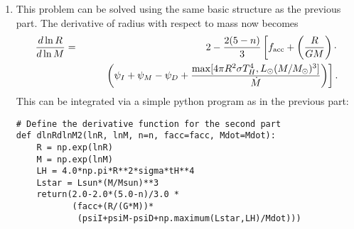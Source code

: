 \begin{enumerate}
\begin{enumerate}
\begin{verbatim}
# Define some constants in cgs
G = 6.67e-8
eV = 1.6e-12
amu = 1.66e-24
sigma = 5.67e-5
Msun = 1.99e33
Rsun = 6.96e10
Lsun = 3.83e33
yr = 365.25*24.*3600.

# Problem parameters
psiI = 13.6*eV/amu
psiM = 2.2*eV/amu
psiD = 100*eV/amu
tH = 3500.0

# Default parameters
n = 1.5
facc = 0.75
Mdot = 1e-5*Msun/yr

# Define the derivative function
def dlnRdlnM(lnR, lnM, n=n, facc=facc, Mdot=Mdot):
    R = np.exp(lnR)
    M = np.exp(lnM)
    return(2.0-2.0*(5.0-n)/3.0 *
           (facc+(R/(G*M))*
            (psiI+psiM-psiD+
             4.0*np.pi*R**2*sigma*tH**4/Mdot)))

# Integrate
lnM = np.log(np.logspace(-2, 0, 500)*Msun)
lnR = odeint(dlnRdlnM, np.log(2.5*Rsun), lnM,
             args=(n, facc, Mdot))
R = np.exp(lnR[:,0])
M = np.exp(lnM)
             
# Get luminosity
L = facc*G*M*Mdot/R + 4.0*np.pi*R**2*sigma*tH**4

# Plot radius
p1,=plt.plot(M/Msun, R/Rsun, 'b', lw=2)
plt.xscale('log')
plt.xlabel(r'$M/M_\odot$')
plt.ylabel(r'$R/R_\odot$')

# Plot luminosity
plt.twinx()
p2,=plt.plot(M/Msun, L/Lsun, 'r', lw=2)
plt.ylabel(r'$L/L_\odot$')
plt.legend([p1,p2], ['Radius', 'Luminosity'],
           loc='lower right')
\end{verbatim}
\begin{marginfigure}
\texttt{[image: hw5sol1]}
\caption[Solution to problem set~\thesolutionset, problem~\theenumi\theenumii]{
\label{fig:hw5sol1}
Radius (blue) and luminosity (red) for the simple protostellar evolution model.
}
\end{marginfigure}
The resulting output is shown as Figure \ref{fig:hw5sol1}. Note that the radius is too large by a factor of $\sim 3$ compared to more sophisticated models, mainly due to the incorrect assumption that all the accreted deuterium burns as quickly as it accretes. In reality the D luminosity should be significantly lower, because D burning lasts longer than accretion.

\item This problem can be solved using the same basic structure as the previous part. The derivative of radius with respect to mass now becomes
\begin{eqnarray*}
\frac{d\ln R}{d\ln M} & = & 2 - \frac{2(5-n)}{3} \left[f_{\rm acc} + \left(\frac{R}{G M}\right) \cdot \right.
\\
& & \qquad \left.\left(\psi_I+\psi_M -\psi_D + \frac{\max[4\pi R^2\sigma T_H^4, L_{\odot} (M/M_{\odot})^3]}{\dot{M}}\right)\right].
\end{eqnarray*}
This can be integrated via a simple python program as in the previous part:
\begin{verbatim}
# Define the derivative function for the second part
def dlnRdlnM2(lnR, lnM, n=n, facc=facc, Mdot=Mdot):
    R = np.exp(lnR)
    M = np.exp(lnM)
    LH = 4.0*np.pi*R**2*sigma*tH**4
    Lstar = Lsun*(M/Msun)**3
    return(2.0-2.0*(5.0-n)/3.0 *
           (facc+(R/(G*M))*
            (psiI+psiM-psiD+np.maximum(Lstar,LH)/Mdot)))


\end{verbatim}
\end{enumerate}
\end{enumerate}
